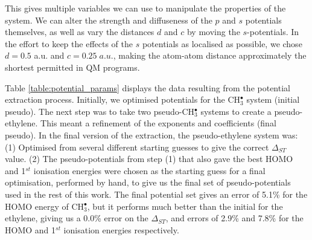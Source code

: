 \documentclass[12pt]{article}
\begin{document}
This gives multiple variables we can use to manipulate the properties of the system.
We can alter the strength and diffuseness of the \(p\) and \(s\) potentials themselves,
as well as vary the distances \(d\) and \(c\) by moving the \(s\)-potentials.
In the effort to keep the effects 
of the $s$ potentials as localised as possible, we chose $d=0.5$ a.u. and \(c = 0.25\;a.u.\), making the atom-atom distance approximately the shortest permitted in QM programs.

Table \ref{table:potential_params} displays the data resulting from the potential extraction process. 
Initially, we optimised potentials for the CH$_3^\bullet$ system (initial pseudo).
The next step was to take two pseudo-CH\(^{\bullet}_{3}\) systems to create a pseudo-ethylene. 
This meant a refinement of the exponents and coefficients (final pseudo).
In the final version of the extraction, the pseudo-ethylene system was: (1) Optimised from several different starting guesses to give the correct $\Delta_{ST}$ value. (2) The pseudo-potentials from step (1) that also gave the best HOMO and 1$^{st}$ ionisation energies were chosen as the starting guess for a final optimisation, performed by hand, to give us the final set of pseudo-potentials used in the rest of this work.
The final potential set gives an error of 5.1\% for the HOMO energy of CH\(^{\bullet}_{3}\), but it
performs much better than the initial for the ethylene,
giving us a 0.0\% error on the $\Delta_{ST}$, and errors of 2.9\% and 7.8\% for the HOMO and 1$^{st}$ ionisation energies respectively.
\end{document}
